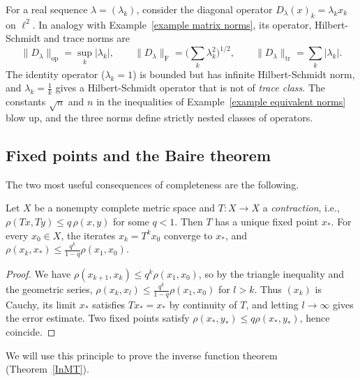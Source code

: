 \begin{example}\label{example trace class}
    For a real sequence $\lambda=(\lambda_k)$, consider the diagonal operator $D_\lambda(x)_k=\lambda_kx_k$ on $\ell^2$. In analogy with Example~\ref{example matrix norms}, its operator, Hilbert-Schmidt and trace norms are
    \[\lVert D_\lambda\rVert_{\mathrm{op}}=\sup_k\lvert\lambda_k\rvert,\qquad\lVert D_\lambda\rVert_{\mathrm{F}}=\Big(\sum_k\lambda_k^2\Big)^{1/2},\qquad\lVert D_\lambda\rVert_{\mathrm{tr}}=\sum_k\lvert\lambda_k\rvert.\]
    The identity operator ($\lambda_k=1$) is bounded but has infinite Hilbert-Schmidt norm, and $\lambda_k=\frac1k$ gives a Hilbert-Schmidt operator that is not of \emph{trace class}. The constants $\sqrt n$ and $n$ in the inequalities of Example~\ref{example equivalent norms} blow up, and the three norms define strictly nested classes of operators.
\end{example}

\subsection{Fixed points and the Baire theorem}

The two most useful consequences of completeness are the following.

\begin{thm}\label{thm contraction}
    Let $X$ be a nonempty complete metric space and $T:X\to X$ a \emph{contraction}, i.e., $\rho(Tx,Ty)\leq q\,\rho(x,y)$ for some $q<1$. Then $T$ has a unique fixed point $x_\ast$. For every $x_0\in X$, the iterates $x_k=T^kx_0$ converge to $x_\ast$, and $\rho(x_k,x_\ast)\leq\frac{q^k}{1-q}\rho(x_1,x_0)$.
\end{thm}
\begin{proof}
    We have $\rho(x_{k+1},x_k)\leq q^k\rho(x_1,x_0)$, so by the triangle inequality and the geometric series, $\rho(x_k,x_l)\leq\frac{q^k}{1-q}\rho(x_1,x_0)$ for $l>k$. Thus $(x_k)$ is Cauchy, its limit $x_\ast$ satisfies $Tx_\ast=x_\ast$ by continuity of $T$, and letting $l\to\infty$ gives the error estimate. Two fixed points satisfy $\rho(x_\ast,y_\ast)\leq q\rho(x_\ast,y_\ast)$, hence coincide.
\end{proof}
We will use this principle to prove the inverse function theorem (Theorem~\ref{InMT}).

